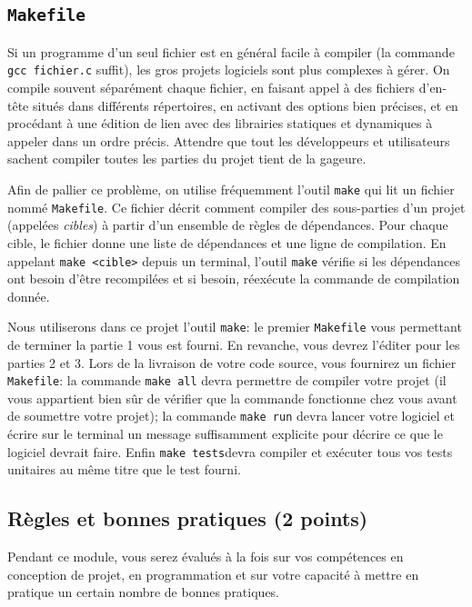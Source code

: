 \documentclass[10pt, a4paper ]{article}
\begin{document}
\subsection{\tt Makefile}

Si un programme d'un seul fichier est en général facile à compiler (la commande
\mbox{\texttt{gcc fichier.c}} suffit), les gros projets logiciels sont  plus
complexes à gérer. On compile souvent séparément chaque fichier, en faisant
appel à des fichiers d'en-tête situés dans différents répertoires, en activant
des options bien précises, et en procédant à une édition de lien avec des
librairies statiques et dynamiques à appeler dans un ordre précis.  Attendre que
tout les développeurs et utilisateurs sachent compiler toutes les parties du
projet tient de la gageure.

Afin de pallier ce problème, on utilise fréquemment l'outil \texttt{make}
qui lit un fichier nommé \mbox{\texttt{Makefile}}. Ce fichier décrit comment
compiler des sous-parties d'un projet (appelées \emph{cibles}) à partir d'un
ensemble de règles de dépendances. Pour chaque cible, le fichier donne une liste
de dépendances et une ligne de compilation. En appelant \mbox{\texttt{make
<cible>}} depuis un terminal, l'outil \texttt{make} vérifie si les
dépendances ont besoin d'être recompilées et si besoin, réexécute la commande de
compilation donnée.

Nous utiliserons dans ce projet l'outil \texttt{make}: le premier
\mbox{\texttt{Makefile}} vous permettant de terminer la partie 1 vous est
fourni. En revanche, vous devrez l'éditer pour les parties 2 et 3. Lors
de la livraison de votre code source, vous fournirez un fichier
\mbox{\texttt{Makefile}}: la commande \mbox{\texttt{make all}} devra permettre
de compiler votre projet (il vous appartient bien sûr de vérifier que la
commande fonctionne chez vous avant de soumettre votre projet); la commande
\mbox{\texttt{make run}} devra lancer votre logiciel et écrire sur le terminal
un message suffisamment explicite pour décrire ce que le logiciel devrait faire.
Enfin \mbox{\texttt{make tests}}devra compiler et exécuter tous vos tests
unitaires au même titre que le test fourni.


\subsection{Règles et bonnes pratiques (2 points)}


Pendant ce module, vous serez évalués à la fois sur vos compétences en
conception de projet, en programmation et sur votre capacité à mettre en
pratique un certain nombre de bonnes pratiques.
\end{document}
